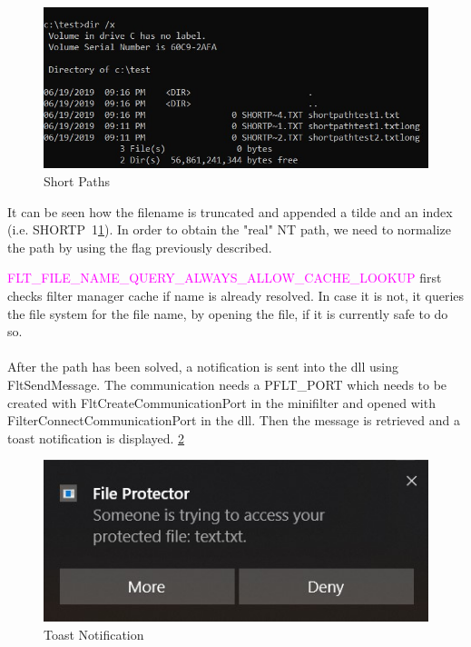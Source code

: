 		\begin{figure}[h!]
			\begin{center}
				\includegraphics{images/ShortPaths.jpg}
				\caption{Short Paths}
				\label{fig:ShortPaths}
			\end{center}
		\end{figure}
	
		It can be seen how the filename is truncated and appended a tilde and an index (i.e. SHORTP~1\ref{fig:ShortPaths}). In order to obtain the "real" NT path, we need to normalize the path by using the flag previously described.
		
		\textcolor{magenta}{FLT\_FILE\_NAME\_QUERY\_ALWAYS\_ALLOW\_CACHE\_LOOKUP} first checks filter manager cache if name is already resolved. In case it is not, it queries the file system for the file name, by opening the file, if it is currently safe to do so.
		
		\paragraph{}
		After the path has been solved, a notification is sent into the dll using FltSendMessage. The communication needs a \textcolor{Emerald}{PFLT\_PORT} which needs to be created with FltCreateCommunicationPort in the minifilter and opened with FilterConnectCommunicationPort in the dll. Then the message is retrieved and a toast notification is displayed. \ref{fig:ToastNotification}
		
		\begin{figure}[h!]
			\begin{center}
				\includegraphics{images/ToastNotification.jpg}
				\caption{Toast Notification}
				\label{fig:ToastNotification}
			\end{center}
		\end{figure}
	
